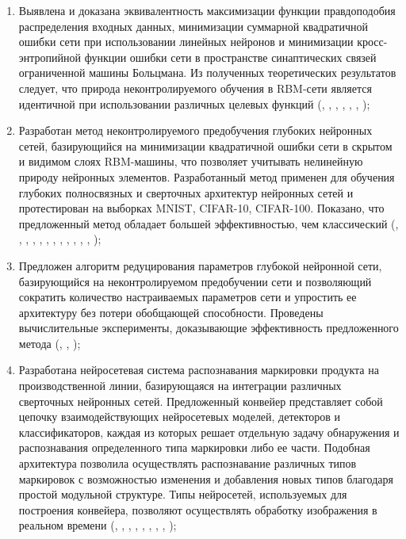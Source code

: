 \begin{enumerate}[wide, labelindent=10mm]

\item Выявлена и доказана эквивалентность максимизации функции правдоподобия распределения входных данных, минимизации суммарной квадратичной ошибки сети при использовании линейных нейронов и минимизации кросс-энтропийной функции ошибки сети в пространстве синаптических связей ограниченной машины Больцмана. Из полученных теоретических результатов следует, что природа неконтролируемого обучения в RBM-сети является идентичной при использовании различных целевых функций (\cite{2-A}, \cite{3-A}, \cite{4-A}, \cite{5-A}, \cite{10-A}, \cite{12-A}, \cite{13-A});
\item Разработан метод неконтролируемого предобучения глубоких нейронных сетей, базирующийся на минимизации квадратичной ошибки сети в скрытом и видимом слоях RBM-машины, что позволяет учитывать нелинейную природу нейронных элементов. Разработанный метод применен для обучения глубоких полносвязных и сверточных архитектур нейронных сетей и протестирован на выборках MNIST, CIFAR-10, CIFAR-100. Показано, что предложенный метод обладает большей эффективностью, чем классический (\cite{1-A}, \cite{2-A}, \cite{3-A}, \cite{4-A}, \cite{5-A}, \cite{10-A}, \cite{12-A}, \cite{13-A}, \cite{17-A}, \cite{18-A}, \cite{19-A}, \cite{20-A}, \cite{21-A});
\item Предложен алгоритм редуцирования параметров глубокой нейронной сети, базирующийся на неконтролируемом предобучении сети и позволяющий сократить количество настраиваемых параметров сети и упростить ее архитектуру без потери обобщающей способности. Проведены вычислительные эксперименты, доказывающие эффективность предложенного метода (\cite{11-A}, \cite{16-A}, \cite{30-A});
\item Разработана нейросетевая система распознавания маркировки продукта на производственной линии, базирующаяся на интеграции различных сверточных нейронных сетей. Предложенный конвейер представляет собой цепочку взаимодействующих нейросетевых моделей, детекторов и классификаторов, каждая из которых решает отдельную задачу обнаружения и распознавания определенного типа маркировки либо ее части. Подобная архитектура позволила осуществлять распознавание различных типов маркировок с возможностью изменения и добавления новых типов благодаря простой модульной структуре. Типы нейросетей, используемых для построения конвейера, позволяют осуществлять обработку изображения в реальном времени (\cite{6-A}, \cite{7-A}, \cite{8-A}, \cite{22-A}, \cite{23-A}, \cite{24-A}, \cite{25-A}, \cite{26-A}, \cite{27-A});

\end{enumerate}
